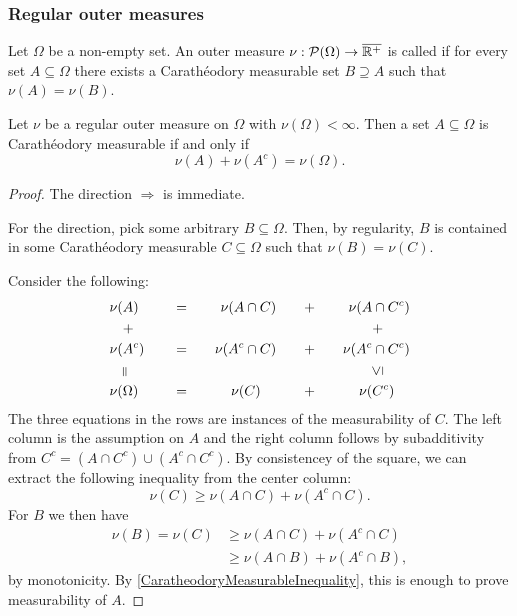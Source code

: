 \subsubsection{Regular outer measures}
\begin{definition}
Let $\Omega$ be a non-empty set. An outer measure $\nu: \operatorname{\mathcal{P}}(\Omega)\to \overline{\mathbb{R}^+}$ is called  if for every set $A\subseteq \Omega$ there exists a Carathéodory measurable set $B\supseteq A$ such that $\nu(A) = \nu(B)$.
\end{definition}

\begin{proposition}
Let $\nu$ be a regular outer measure on $\Omega$ with $\nu(\Omega) < \infty$. Then a set $A\subseteq \Omega$ is Carathéodory measurable \textup{if and only if}
\[ \nu(A) + \nu(A^c) = \nu(\Omega). \]
\end{proposition}
\begin{proof}
The direction $\Rightarrow$ is immediate.

For the direction, pick some arbitrary $B\subseteq\Omega$. Then, by regularity, $B$ is contained in some Carathéodory measurable $C\subseteq \Omega$ such that $\nu(B) = \nu(C)$.

Consider the following:
\begin{alignat*}{5}
\nu(&A) & &= \quad & \nu(A&\cap C) & &+ & \nu(A&\cap C^c) \\
&+ &&& & &&& &+ \\
\nu(&A^c) & \quad &= & \nu(A^c&\cap C) & \quad&+\quad & \nu(A^c&\cap C^c) \\
&\rotatebox[origin=c]{90}{$=$} &&& & &&& &\rotatebox[origin=c]{90}{$\leq$} \\
\nu(&\Omega) & &= & \nu(&C) & &+ & \nu(&C^c)
\end{alignat*}
The three equations in the rows are instances of the measurability of $C$. The left column is the assumption on $A$ and the right column follows by subadditivity from $C^c = (A\cap C^c) \cup (A^c\cap C^c)$. By consistencey of the square, we can extract the following inequality from the center column:
\[ \nu(C) \geq \nu(A\cap C) + \nu(A^c\cap C). \]
For $B$ we then have
\begin{align*}
\nu(B) = \nu(C) &\geq \nu(A\cap C) + \nu(A^c\cap C) \\
&\geq \nu(A\cap B) + \nu(A^c\cap B),
\end{align*}
by monotonicity. By \ref{CaratheodoryMeasurableInequality}, this is enough to prove measurability of $A$. 
\end{proof}

